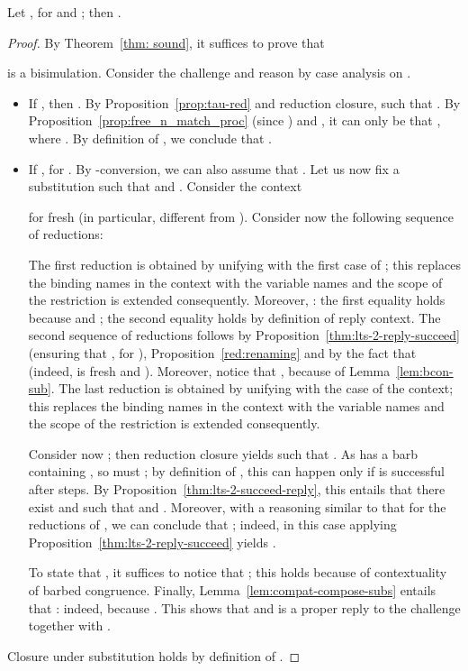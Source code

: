 \documentclass{LMCS}
\begin{document}
\begin{lem}
\label{lem:succ-beq}
Let , 
for  and ; then .
\end{lem}
\begin{proof}
By Theorem~\ref{thm: sound}, it suffices to prove that

is a bisimulation. Consider the challenge  and reason by case analysis on .
\begin{itemize}
\item If , then .
By Proposition~\ref{prop:tau-red} and reduction closure, 
 such that .
By Proposition~\ref{prop:free_n_match_proc} (since ) and , it can only be that
, where .
By definition of , we conclude that .

\item If , for .
By -conversion, we can also assume that .
Let us now fix a substitution  such that  and
. Consider the context

for  fresh (in particular, different from ). Consider now the following sequence of reductions:

The first reduction is obtained by unifying  with the first
case of ; this replaces the binding names  in the context with 
the variable names  and the scope of the restriction is extended consequently.
Moreover, : the first equality holds because
 and ;
the second equality holds by definition of reply context.
The second sequence of reductions follows by Proposition~\ref{thm:lts-2-reply-succeed}
(ensuring that , for ), 
Proposition~\ref{red:renaming}
and by the fact that 
(indeed,  is fresh and ).
Moreover, notice that , because of 
Lemma~\ref{lem:bcon-sub}.
The last reduction is obtained by unifying  with the 
case  of the context; this replaces the binding names  
in the context with the variable names  and the scope of the restriction 
is extended consequently.

Consider now ; then
reduction closure yields
 such
that . As  has a barb containing , so must  ;
by definition of , this can happen only if 
is successful after  steps. By Proposition~\ref{thm:lts-2-succeed-reply},
this entails that there exist  and  such that 
and . Moreover, with a reasoning similar to that
for the reductions of , we can conclude
that ;
indeed, in this case applying  Proposition~\ref{thm:lts-2-reply-succeed} yields
.

To state that , it suffices to notice
that ; this holds because of contextuality of barbed congruence.
Finally, Lemma~\ref{lem:compat-compose-subs} entails that : 
indeed,  because .
This shows that  and  is a proper reply to the challenge 
 together with .
\end{itemize}
Closure under substitution holds by definition of .
\end{proof}
\end{document}
